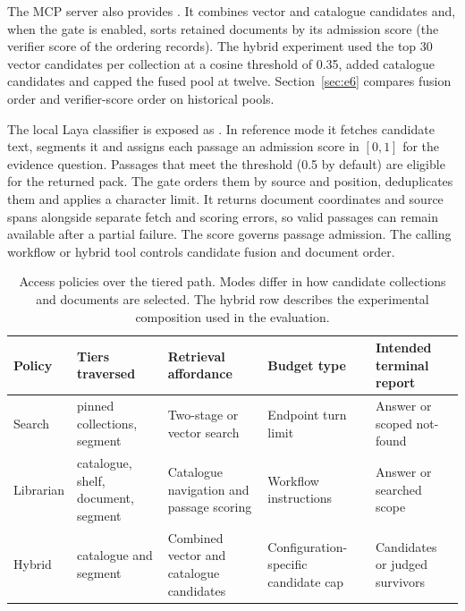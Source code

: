 The MCP server also provides . It combines vector
and catalogue candidates and, when the gate is enabled, sorts retained
documents by its admission score (the verifier score of the ordering
records). The hybrid experiment used the top 30 vector
candidates per collection at a cosine threshold of 0.35, added catalogue
candidates and capped the fused pool at twelve. Section~\ref{sec:e6}
compares fusion order and verifier-score order on historical pools.

The local Laya classifier \cite{laya} is exposed as .
In reference mode it fetches candidate text, segments it and assigns each
passage an admission score in $[0,1]$ for the evidence question. Passages
that meet the threshold (0.5 by default) are eligible for the returned
pack. The gate orders them by source and position, deduplicates them and
applies a character limit. It returns document coordinates and source
spans alongside separate fetch and scoring errors, so valid passages can
remain available after a partial failure. The score governs passage
admission. The calling workflow or hybrid tool controls candidate fusion
and document order.

\begin{table}[t]
\centering
\small
\setlength{\tabcolsep}{5pt}
\caption{Access policies over the tiered path. Modes differ in how candidate collections and documents are selected.
The hybrid row describes the experimental composition used in the evaluation.}
\label{tab:lanes}
\begin{tabular}{@{}>{\raggedright\arraybackslash}p{}>{\raggedright\arraybackslash}p{}>{\raggedright\arraybackslash}p{}>{\raggedright\arraybackslash}p{}>{\raggedright\arraybackslash}p{}@{}}
\toprule
Policy & Tiers traversed & Retrieval affordance & Budget type & Intended terminal report\\
\midrule
Search & pinned collections, segment & Two-stage or vector search & Endpoint turn limit & Answer or scoped not-found\\
Librarian & catalogue, shelf, document, segment & Catalogue navigation and passage scoring & Workflow instructions & Answer or searched scope\\
Hybrid & catalogue and segment & Combined vector and catalogue candidates & Configuration-specific candidate cap & Candidates or judged survivors\\
\bottomrule
\end{tabular}
\end{table}

